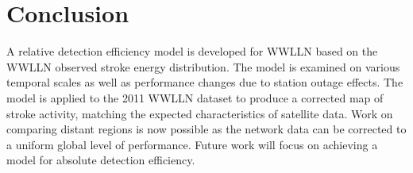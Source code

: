 \section{Conclusion}

A relative detection efficiency model is developed for WWLLN based on the WWLLN observed stroke energy distribution.
The model is examined on various temporal scales as well as performance changes due to station outage effects.
The model is applied to the 2011 WWLLN dataset to produce a corrected map of stroke activity, matching the expected characteristics of satellite data.
Work on comparing distant regions is now possible as the network data can be corrected to a uniform global level of performance.
Future work will focus on achieving a model for absolute detection efficiency.